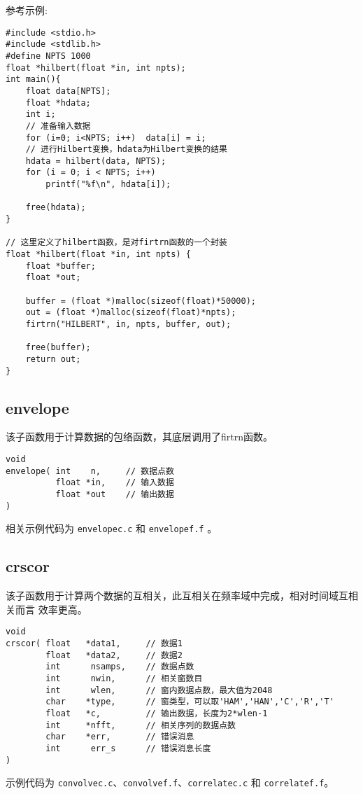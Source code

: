 参考示例:
\begin{verbatim}
#include <stdio.h>
#include <stdlib.h>
#define NPTS 1000
float *hilbert(float *in, int npts);
int main(){
    float data[NPTS];
    float *hdata;
    int i;
    // 准备输入数据
    for (i=0; i<NPTS; i++)  data[i] = i;
    // 进行Hilbert变换，hdata为Hilbert变换的结果
    hdata = hilbert(data, NPTS);
    for (i = 0; i < NPTS; i++)
        printf("%f\n", hdata[i]);

    free(hdata);
}

// 这里定义了hilbert函数，是对firtrn函数的一个封装
float *hilbert(float *in, int npts) {
    float *buffer;
    float *out;

    buffer = (float *)malloc(sizeof(float)*50000);
    out = (float *)malloc(sizeof(float)*npts);
    firtrn("HILBERT", in, npts, buffer, out);

    free(buffer);
    return out;
}
\end{verbatim}

\subsection{envelope}
该子函数用于计算数据的包络函数，其底层调用了firtrn函数。
\begin{verbatim}
void
envelope( int    n,     // 数据点数
          float *in,    // 输入数据
          float *out    // 输出数据
)
\end{verbatim}

相关示例代码为 \texttt{envelopec.c} 和 \texttt{envelopef.f} 。

\subsection{crscor}
该子函数用于计算两个数据的互相关，此互相关在频率域中完成，相对时间域互相关而言
效率更高。

\begin{verbatim}
void
crscor( float   *data1,     // 数据1
        float   *data2,     // 数据2
        int      nsamps,    // 数据点数
        int      nwin,      // 相关窗数目
        int      wlen,      // 窗内数据点数，最大值为2048
        char    *type,      // 窗类型，可以取'HAM','HAN','C','R','T'
        float   *c,         // 输出数据，长度为2*wlen-1
        int     *nfft,      // 相关序列的数据点数
        char    *err,       // 错误消息
        int      err_s      // 错误消息长度
)
\end{verbatim}

示例代码为 \texttt{convolvec.c}、\texttt{convolvef.f}、\texttt{correlatec.c} 和 \texttt{correlatef.f}。
